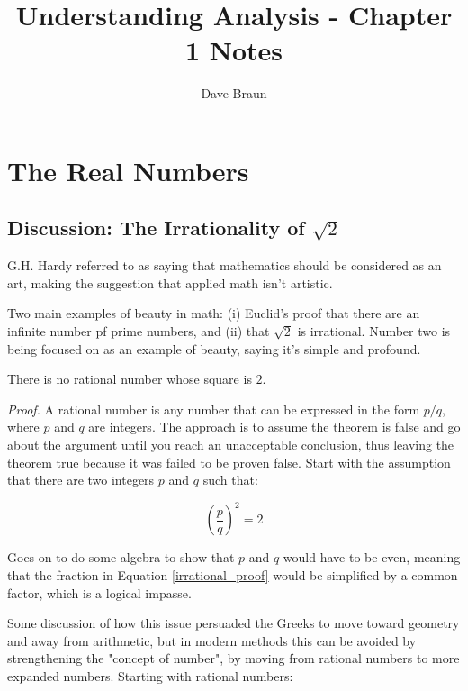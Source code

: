 \documentclass{article}
\numberwithin{equation}{subsection}
\numberwithin{theo}{subsection}
\begin{document}
\title{Understanding Analysis - Chapter 1 Notes}

\author{Dave Braun}
\maketitle

\section{The Real Numbers}
\subsection{Discussion: The Irrationality of $\sqrt{2}$}
G.H. Hardy referred to as saying that mathematics should be considered as an
art, making the suggestion that applied math isn't artistic.

Two main examples of beauty in math: (i) Euclid's proof that there are an
infinite number pf prime numbers, and (ii) that $\sqrt{2}$ is irrational. Number
two is being focused on as an example of beauty, saying it's simple and
profound.

\begin{theo}
    \label{sqtwo}
    There is no rational number whose square is $2$.
\end{theo}

\emph{Proof.} A rational number is any number that can be expressed in the form
$p/q$, where $p$ and $q$ are integers. The approach is to assume the theorem is
false and go about the argument until you reach an unacceptable conclusion, thus
leaving the theorem true because it was failed to be proven false. Start with
the assumption that there are two integers $p$ and $q$ such that:

\begin{equation}\label{irrational_proof}
    \left(\frac{p}{q}\right)^{2} = 2
\end{equation}

Goes on to do some algebra to show that $p$ and $q$ would have to be even,
meaning that the fraction in Equation \ref{irrational_proof} would be simplified by a
common factor, which is a logical impasse. 

Some discussion of how this issue persuaded the Greeks to move toward geometry
and away from arithmetic, but in modern methods this can be avoided by
strengthening the "concept of number", by moving from rational numbers to more
expanded numbers. Starting with rational numbers:
\end{document}
